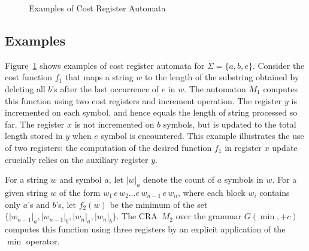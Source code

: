\documentclass[11pt]{article}
\newcommand{\mypar}[1]{\subsection{#1}}
\newcommand{\CG}{G}
\newcommand{\EDWA}{{CRA}\xspace}
\newcommand{\edwa}{\ensuremath{M}}
\begin{document}
\begin{figure}[t]
\caption{Examples of Cost Register Automata\label{rcfex1}}
\end{figure}


\mypar{Examples}
Figure~\ref{rcfex1} shows examples of cost register automata for
$\Sigma=\{a,b,e\}$.  Consider the cost function $f_1$ that maps a
string $w$ to the length of the substring obtained by deleting all
$b$'s after the last occurrence of $e$ in $w$.  The automaton
$\edwa_1$ computes this function using two cost registers and
increment operation.  The register $y$ is incremented on each symbol,
and hence equals the length of string processed so far.  The register
$x$ is not incremented on $b$ symbols, but is updated to the total
length stored in $y$ when $e$ symbol is encountered.  This example
illustrates the use of two registers: the computation of the desired
function $f_1$ in register $x$ update crucially relies on the
auxiliary register $y$.

For a string $w$ and symbol $a$, let $|w|_a$ denote the count of $a$
symbols in $w$.  For a given string $w$ of the form $w_1\,e\,w_2\ldots
e\,w_{n-1}\,e\,w_n$, where each block $w_i$ contains only $a$'s and
$b$'s, let $f_2(w)$ be the minimum of the set
$\{|w_{n-1}|_a,|w_{n-1}|_b,|w_n|_a,|w_n|_b\}$.  The \EDWA\ $\edwa_2$
over the grammar $\CG(\min,+c)$ computes this function using three
registers by an explicit application of the $\min$ operator.
\end{document}
